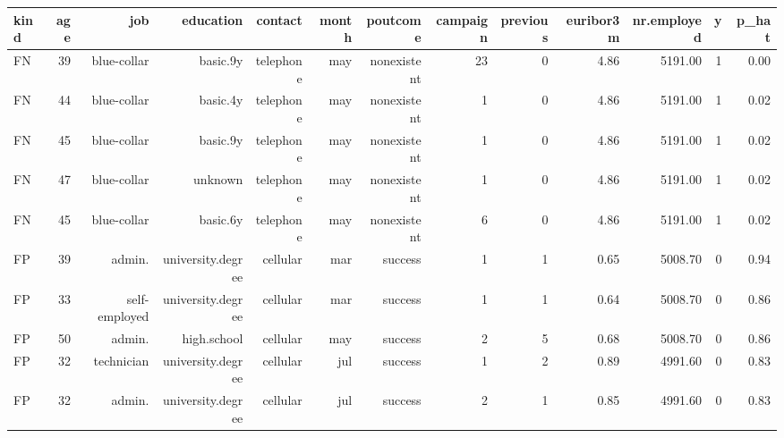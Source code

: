 \begin{tabular}{lrrrrrrrrrrrr}
\toprule
kind & age & job & education & contact & month & poutcome & campaign & previous & euribor3m & nr.employed & y & p\_hat \\
\midrule
FN & 39 & blue-collar & basic.9y & telephone & may & nonexistent & 23 & 0 & 4.86 & 5191.00 & 1 & 0.00 \\
FN & 44 & blue-collar & basic.4y & telephone & may & nonexistent & 1 & 0 & 4.86 & 5191.00 & 1 & 0.02 \\
FN & 45 & blue-collar & basic.9y & telephone & may & nonexistent & 1 & 0 & 4.86 & 5191.00 & 1 & 0.02 \\
FN & 47 & blue-collar & unknown & telephone & may & nonexistent & 1 & 0 & 4.86 & 5191.00 & 1 & 0.02 \\
FN & 45 & blue-collar & basic.6y & telephone & may & nonexistent & 6 & 0 & 4.86 & 5191.00 & 1 & 0.02 \\
FP & 39 & admin. & university.degree & cellular & mar & success & 1 & 1 & 0.65 & 5008.70 & 0 & 0.94 \\
FP & 33 & self-employed & university.degree & cellular & mar & success & 1 & 1 & 0.64 & 5008.70 & 0 & 0.86 \\
FP & 50 & admin. & high.school & cellular & may & success & 2 & 5 & 0.68 & 5008.70 & 0 & 0.86 \\
FP & 32 & technician & university.degree & cellular & jul & success & 1 & 2 & 0.89 & 4991.60 & 0 & 0.83 \\
FP & 32 & admin. & university.degree & cellular & jul & success & 2 & 1 & 0.85 & 4991.60 & 0 & 0.83 \\
\bottomrule
\end{tabular}